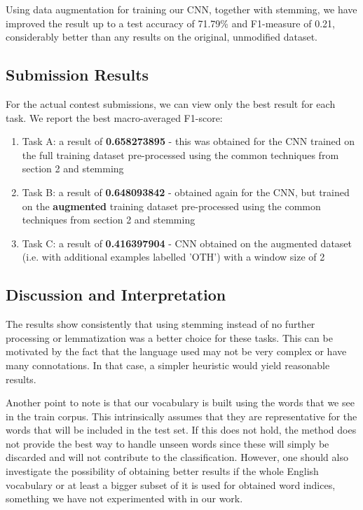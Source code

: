 \documentclass[11pt,a4paper]{article}
\begin{document}
Using data augmentation for training our CNN, together with stemming, we have improved the result up to a test accuracy of 71.79\% and F1-measure of 0.21, considerably better than any results on the original, unmodified dataset.


\subsection{Submission Results}

For the actual contest submissions, we can view only the best result for each task. We report the best macro-averaged F1-score:

\begin{enumerate}
    \item Task A: a result of \textbf{0.658273895} - this was obtained for the CNN trained on the full training dataset pre-processed using the common techniques from section 2 and stemming
    \item Task B: a result of \textbf{0.648093842} - obtained again for the CNN, but trained on the \textbf{augmented} training dataset pre-processed using the common techniques from section 2 and stemming
    \item Task C: a result of \textbf{0.416397904} - CNN obtained on the augmented dataset (i.e. with additional examples labelled 'OTH') with a window size of 2
\end{enumerate}

\subsection{Discussion and Interpretation}

The results show consistently that using stemming instead of no further processing or lemmatization was a better choice for these tasks. This can be motivated by the fact that the language used may not be very complex or have many connotations. In that case, a simpler heuristic would yield reasonable results.

Another point to note is that our vocabulary is built using the words that we see in the train corpus. This intrinsically assumes that they are representative for the words that will be included in the test set. If this does not hold, the method does not provide the best way to handle unseen words since these will simply be discarded and will not contribute to the classification. However, one should also investigate the possibility of obtaining better results if the whole English vocabulary or at least a bigger subset of it is used for obtained word indices, something we have not experimented with in our work.
\end{document}

